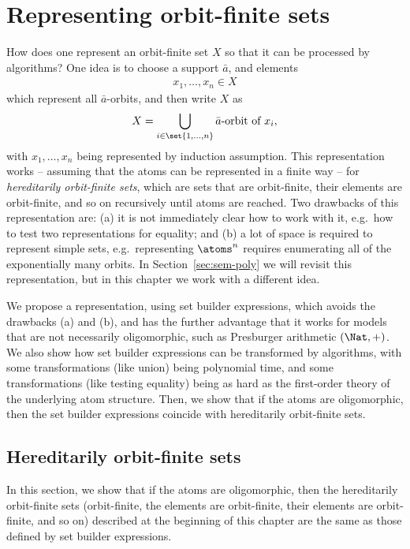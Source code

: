 \chapter{Representing orbit-finite sets}
\label{sec:definable-sets}
How does one represent an orbit-finite set $X$ so that it can be processed by algorithms? 
One idea is to choose a support $\bar a$, and elements 
\begin{align*}
	x_1,\ldots,x_n \in X
\end{align*}
which represent all $\bar a$-orbits, and then write $X$ as 
\begin{align*}
	X = \bigcup_{i \in \set{1,\ldots,n}} \text{$\bar a$-orbit of $x_i$},
\end{align*}
with $x_1,\ldots,x_n$ being represented by induction assumption. This representation works -- assuming that the atoms can be represented in a finite way -- for \emph{hereditarily orbit-finite sets}, which are sets that are orbit-finite, their elements are orbit-finite, and so on recursively until atoms are reached. Two drawbacks of this representation are: (a) it is not immediately clear how to work with it, e.g.~how to test two representations for equality; and (b) a lot of space is required to represent simple sets, e.g.~representing $\atoms^n$ requires enumerating all of the exponentially many orbits. In Section~\ref{sec:sem-poly} we will revisit this representation, but in this chapter we work with a different idea.

We propose a representation, using set builder expressions, which avoids the drawbacks (a) and (b), and has the further advantage that it works for models that are not necessarily oligomorphic, such as Presburger arithmetic $(\Nat,+)$. We also show how set builder expressions can be transformed by algorithms, with some transformations (like union) being polynomial time, and some transformations (like testing equality) being as hard as the first-order theory of the underlying atom structure. Then, we show that if the atoms are oligomorphic, then the set builder expressions coincide with hereditarily orbit-finite sets. 










\section{Hereditarily orbit-finite sets}\label{sec:hof}
In this section, we show that if the atoms are oligomorphic, then the hereditarily orbit-finite sets (orbit-finite, the elements are orbit-finite, their elements are orbit-finite, and so on) described at the beginning of this chapter are the same as those defined by set builder expressions.

